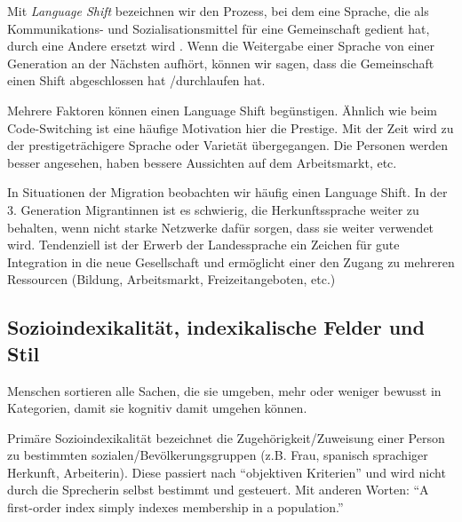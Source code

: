 
Mit \textit{Language Shift} bezeichnen wir den Prozess, bei dem eine Sprache, die als Kommunikations- und Sozialisationsmittel für eine Gemeinschaft gedient hat, durch eine Andere ersetzt wird \cite[vgl.][]{Potowski13}.
Wenn die Weitergabe einer Sprache von einer Generation an der Nächsten aufhört, können wir sagen, dass die Gemeinschaft einen Shift abgeschlossen hat /durchlaufen hat.

Mehrere Faktoren können einen Language Shift begünstigen.
Ähnlich wie beim Code-Switching ist eine häufige Motivation hier die Prestige.
Mit der Zeit wird zu der prestigeträchigere Sprache oder Varietät übergegangen.
Die Personen werden besser angesehen, haben bessere Aussichten auf dem Arbeitsmarkt, etc.

In Situationen der Migration beobachten wir häufig einen Language Shift.
In der 3. Generation Migrantinnen ist es schwierig, die Herkunftssprache weiter zu behalten, wenn nicht starke Netzwerke dafür sorgen, dass sie weiter verwendet wird.
Tendenziell ist der Erwerb der Landessprache ein Zeichen für gute Integration in die neue Gesellschaft und ermöglicht einer den Zugang zu mehreren Ressourcen (Bildung, Arbeitsmarkt, Freizeitangeboten, etc.)

\subsection{Sozioindexikalität, indexikalische Felder und Stil}

Menschen sortieren alle Sachen, die sie umgeben, mehr oder weniger bewusst in Kategorien, damit sie kognitiv damit umgehen können.

Primäre Sozioindexikalität bezeichnet die Zugehörigkeit/Zuweisung einer Person zu bestimmten sozialen/Bevölkerungsgruppen (z.B. Frau, spanisch sprachiger Herkunft, Arbeiterin). %
Diese passiert nach ``objektiven Kriterien'' und wird nicht durch die Sprecherin selbst bestimmt und gesteuert.
Mit anderen Worten: ``A first-order index simply indexes membership in a population.'' \cite[vgl.][]{Eckert08}

